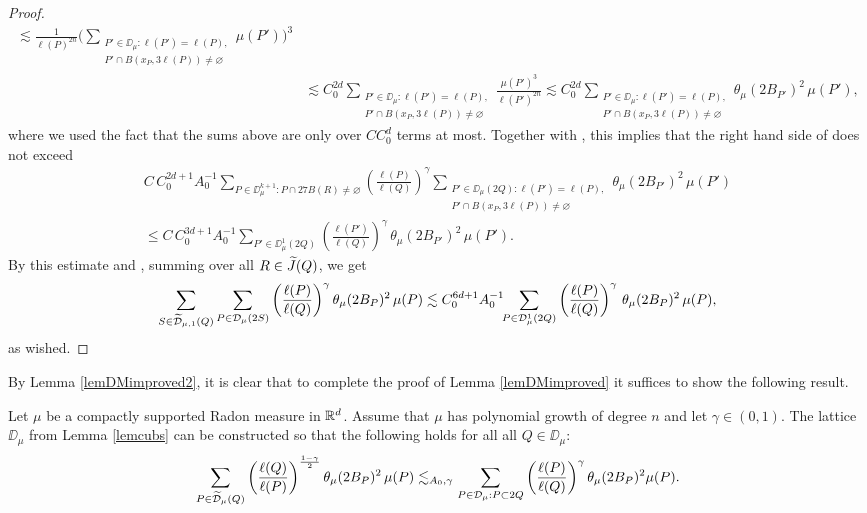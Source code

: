 \begin{proof}
\begin{align*}
		\lesssim \frac1{\ell(P)^{2n}}
		\bigg(\sum_{\substack{P'\in\DD_\mu:\ell(P')=\ell(P),\\
				P'\cap  B(x_P,3\ell(P))\neq\varnothing}}
		\mu(P')\bigg)^3\\
		& \lesssim C_0^{2d} \!\!\!\sum_{\substack{P'\in\DD_\mu:\ell(P')=\ell(P),\\
				P'\cap  B(x_P,3\ell(P))\neq\varnothing}}\!\frac{\mu(P')^3}{\ell(P')^{2n}}\lesssim
		C_0^{2d} \!\!\!\sum_{\substack{P'\in\DD_\mu:\ell(P')=\ell(P),\\
				P'\cap  B(x_P,3\ell(P))\neq\varnothing}}\!\!\theta_\mu(2B_{P'})^2\,\mu(P'),
	\end{align*}
	where we used the fact that the sums above are only over $CC_0^d$ terms at most.
	Together with , this implies that
	the right hand side of  does not exceed
	\begin{multline*}
		C\,C_0^{2d+1}A_0^{-1} \sum_{P\in \DD_\mu^{k+1}:P\cap 27B(R)\neq\varnothing}\left(\frac{\ell(P)}{\ell(Q)}\right)^\gamma  \!\!\!\!\!\sum_{\substack{P'\in\DD_\mu(2Q):\ell(P')=\ell(P),\\
				P'\cap  B(x_P,3\ell(P))\neq\varnothing}}\!\!\!\theta_\mu(2B_{P'})^2\,\mu(P')
		\\ \leq 
		C\,C_0^{3d+1}A_0^{-1}
		\sum_{P'\in \DD_\mu^{1}(2Q)}\left(\frac{\ell(P')}{\ell(Q)}\right)^\gamma\, \theta_\mu(2B_{P'})^2\,\mu(P').
	\end{multline*}
	By this estimate and , summing over all $R\in{\widetilde{J}}(Q)$, we get
	$$\sum_{S\in{\widetilde{{\mathcal D}}}_{\mu,1}(Q)} \sum_{P\in{\mathcal D}_\mu(2S)} \left(\frac{\ell(P)}{\ell(Q)}\right)^\gamma\theta_\mu(2B_P)^2\,\mu(P)\lesssim
	C_0^{6d+1}A_0^{-1}\!\!
	\sum_{P\in {\mathcal D}_\mu^1(2Q)}\left(\frac{\ell(P)}{\ell(Q)}\right)^\gamma\, \theta_\mu(2B_P)^2\,\mu(P),
	$$%
	as wished.
\end{proof}

\vv



By Lemma \ref{lemDMimproved2}, it is clear that to complete the proof of Lemma \ref{lemDMimproved} it suffices to show the following result.

\begin{lemma}\label{lemdmutot}
	Let $\mu$ be a compactly supported Radon measure in ${\mathbb R}^{d}$.
	Assume that $\mu$ has polynomial growth of degree $n$ and let $\gamma\in(0,1)$. The lattice $\DD_\mu$ from Lemma \ref{lemcubs} can be constructed so that the following holds for all
	all $Q\in\DD_{\mu}$:
	\begin{equation}\label{eqfhq29}
		\sum_{P\in{\widetilde{{\mathcal D}}}_\mu(Q)} \left(\frac{\ell(Q)}{\ell(P)}\right)^{\frac{1-\gamma}2} \theta_\mu(2B_P)^2
		\,\mu(P) \lesssim_{A_0,\gamma}\sum_{P\in{\mathcal D}_\mu: P\subset 2Q} \left(\frac{\ell(P)}{\ell(Q)}\right)^\gamma\theta_\mu(2B_P)^2\mu(P).
	\end{equation}
\end{lemma}


